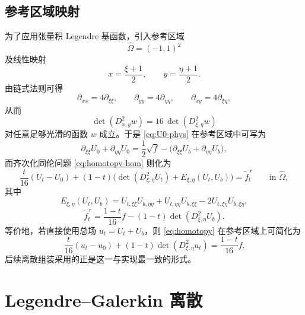\documentclass[11pt,a4paper]{article}
\begin{document}
\subsection{参考区域映射}
为了应用张量积 Legendre 基函数，引入参考区域
\[
\widehat\Omega=(-1,1)^2
\]
及线性映射
\begin{equation}
x=\frac{\xi+1}{2},
\qquad
y=\frac{\eta+1}{2}.
\label{eq:map}
\end{equation}
由链式法则可得
\begin{equation}
\partial_{xx}=4\partial_{\xi\xi},
\qquad
\partial_{yy}=4\partial_{\eta\eta},
\qquad
\partial_{xy}=4\partial_{\xi\eta},
\label{eq:scaling-second}
\end{equation}
从而
\begin{equation}
\det(D^2_{x,y}w)=16\,\det(D^2_{\xi,\eta}w)
\label{eq:det-scaling}
\end{equation}
对任意足够光滑的函数 $w$ 成立。于是 \eqref{eq:U0-phys} 在参考区域中可写为
\begin{equation}
\partial_{\xi\xi}U_0+\partial_{\eta\eta}U_0
=
\frac{1}{2}\sqrt{f}-\bigl(\partial_{\xi\xi}U_b+\partial_{\eta\eta}U_b\bigr),
\label{eq:U0-ref}
\end{equation}
而齐次化同伦问题 \eqref{eq:homotopy-hom} 则化为
\begin{equation}
\frac{t}{16}(U_t-U_0)
+(1-t)\bigl(\det(D^2_{\xi,\eta}U_t)+E_{\xi,\eta}(U_t,U_b)\bigr)
=
\widetilde f_t^{\,r}
\qquad \text{in }\widehat\Omega,
\label{eq:homotopy-ref-hom}
\end{equation}
其中
\begin{equation}
E_{\xi,\eta}(U_t,U_b)
=
U_{t,\xi\xi}U_{b,\eta\eta}+U_{t,\eta\eta}U_{b,\xi\xi}-2U_{t,\xi\eta}U_{b,\xi\eta},
\label{eq:E-ref}
\end{equation}
\begin{equation}
\widetilde f_t^{\,r}
=
\frac{1-t}{16}f-(1-t)\det(D^2_{\xi,\eta}U_b).
\label{eq:f-ref}
\end{equation}
等价地，若直接使用总场 $u_t=U_t+U_b$，则 \eqref{eq:homotopy} 在参考区域上可简化为
\begin{equation}
\frac{t}{16}(u_t-u_0)+(1-t)\det(D^2_{\xi,\eta}u_t)=\frac{1-t}{16}f.
\label{eq:ref}
\end{equation}
后续离散组装采用的正是这一与实现最一致的形式。

\section{Legendre--Galerkin 离散}
\end{document}
